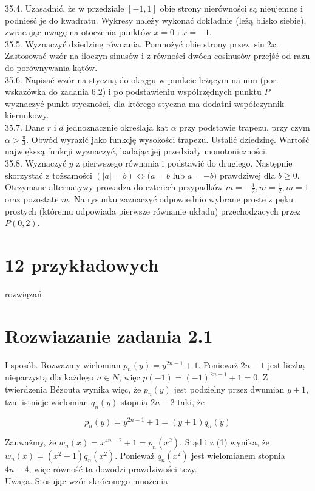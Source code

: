 \documentclass[10pt]{article}
\begin{document}
35.4. Uzasadnić, że w przedziale $[-1,1]$ obie strony nierówności są nieujemne i podnieść je do kwadratu. Wykresy należy wykonać dokładnie (leżą blisko siebie), zwracając uwagę na otoczenia punktów $x=0$ i $x=-1$.\\
35.5. Wyznaczyć dziedzinę równania. Pomnożyć obie strony przez $\sin 2 x$. Zastosować wzór na iloczyn sinusów i z równości dwóch cosinusów przejść od razu do porównywania kątów.\\
35.6. Napisać wzór na styczną do okręgu w punkcie leżącym na nim (por. wskazówka do zadania 6.2) i po podstawieniu współrzędnych punktu $P$ wyznaczyć punkt styczności, dla którego styczna ma dodatni współczynnik kierunkowy.\\
35.7. Dane $r$ i $d$ jednoznacznie określaja kąt $\alpha$ przy podstawie trapezu, przy czym $\alpha>\frac{\pi}{3}$. Obwód wyrazić jako funkcję wysokości trapezu. Ustalić dziedzinę. Wartość największą funkcji wyznaczyć, badając jej przedziały monotoniczności.\\
35.8. Wyznaczyć $y$ z pierwszego równania i podstawić do drugiego. Następnie skorzystać z tożsamości $(|a|=b) \Leftrightarrow(a=b$ lub $a=-b)$ prawdziwej dla $b \geq 0$. Otrzymane alternatywy prowadza do czterech przypadków $m=-\frac{1}{2}, m=\frac{1}{2}, m=1$ oraz pozostate $m$. Na rysunku zaznaczyć odpowiednio wybrane proste z pęku prostych (któremu odpowiada pierwsze równanie układu) przechodzacych przez $P(0,2)$.

\section*{12 przykładowych}
rozwiązań

\section*{Rozwiazanie zadania 2.1}
I sposób. Rozważmy wielomian $p_{n}(y)=y^{2 n-1}+1$. Ponieważ $2 n-1$ jest liczbą nieparzystą dla każdego $n \in N$, więc $p(-1)=(-1)^{2 n-1}+1=0$. Z twierdzenia Bézouta wynika więc, że $p_{n}(y)$ jest podzielny przez dwumian $y+1$, tzn. istnieje wielomian $q_{n}(y)$ stopnia $2 n-2$ taki, że

$$
p_{n}(y)=y^{2 n-1}+1=(y+1) q_{n}(y)
$$

Zauważmy, że $w_{n}(x)=x^{4 n-2}+1=p_{n}\left(x^{2}\right)$. Stąd i z (1) wynika, że $w_{n}(x)=\left(x^{2}+1\right) q_{n}\left(x^{2}\right)$. Ponieważ $q_{n}\left(x^{2}\right)$ jest wielomianem stopnia $4 n-4$, więc równość ta dowodzi prawdziwości tezy.\\
Uwaga. Stosując wzór skróconego mnożenia
\end{document}
